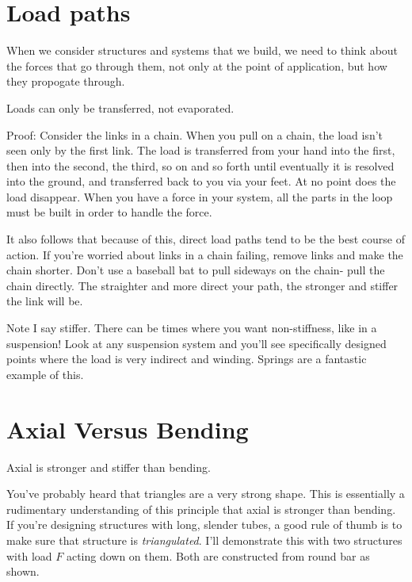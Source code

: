 \section{Load paths}

When we consider structures and systems that we build, we need to think about the forces that go through them, not only at the point of application, but how they propogate through.

\begin{theorem} \label{theorem:load_paths}
	Loads can only be transferred, not evaporated.
\end{theorem}

Proof: Consider the links in a chain. When you pull on a chain, the load isn't seen only by the first link. The load is transferred from your hand into the first, then into the second, the third, so on and so forth until eventually it is resolved into the ground, and transferred back to you via your feet. At no point does the load disappear. When you have a force in your system, all the parts in the loop must be built in order to handle the force.

It also follows that because of this, direct load paths tend to be the best course of action. If you're worried about links in a chain failing, remove links and make the chain shorter. Don't use a baseball bat to pull sideways on the chain- pull the chain directly. The straighter and more direct your path, the stronger and stiffer the link will be.

Note I say stiffer. There can be times where you want non-stiffness, like in a suspension! Look at any suspension system and you'll see specifically designed points where the load is very indirect and winding. Springs are a fantastic example of this.

\section{Axial Versus Bending}

\begin{theorem} \label{theorem:axial_bending}
	Axial is stronger and stiffer than bending.
\end{theorem}

You've probably heard that triangles are a very strong shape. This is essentially a rudimentary understanding of this principle that axial is stronger than bending. If you're designing structures with long, slender tubes, a good rule of thumb is to make sure that structure is \textit{triangulated}.
I'll demonstrate this with two structures with load $F$ acting down on them. Both are constructed from round bar as shown. 


